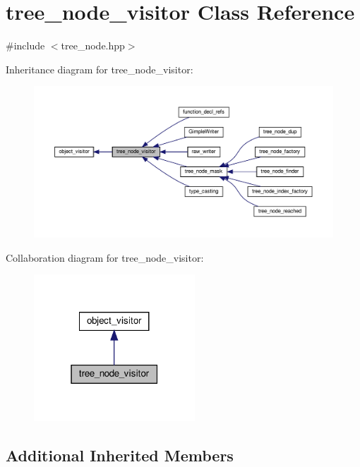 \hypertarget{classtree__node__visitor}{}\section{tree\+\_\+node\+\_\+visitor Class Reference}
\label{classtree__node__visitor}


{\ttfamily \#include $<$tree\+\_\+node.\+hpp$>$}



Inheritance diagram for tree\+\_\+node\+\_\+visitor\+:
\nopagebreak
\begin{figure}[H]
\begin{center}
\leavevmode
\includegraphics[width=350pt]{dd/db1/classtree__node__visitor__inherit__graph}
\end{center}
\end{figure}


Collaboration diagram for tree\+\_\+node\+\_\+visitor\+:
\nopagebreak
\begin{figure}[H]
\begin{center}
\leavevmode
\includegraphics[width=171pt]{d6/d9e/classtree__node__visitor__coll__graph}
\end{center}
\end{figure}
\subsection*{Additional Inherited Members}


